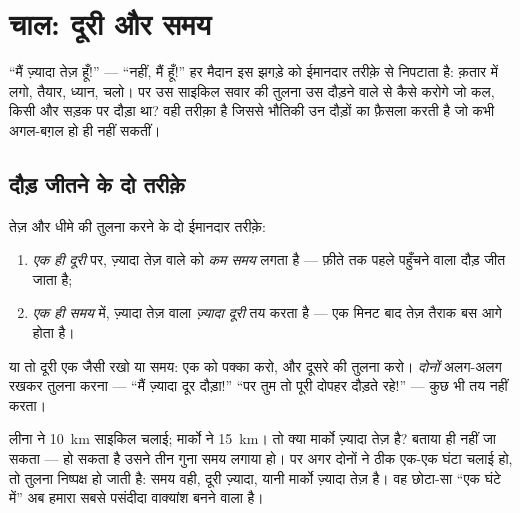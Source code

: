 \chapter{चाल: दूरी और समय}\label{ch:g5:speed-distance-time}

``मैं ज़्यादा तेज़ हूँ!'' --- ``नहीं, मैं हूँ!'' हर मैदान इस झगड़े को
ईमानदार तरीक़े से निपटाता है: क़तार में लगो, तैयार, ध्यान, चलो। पर उस
साइकिल सवार की तुलना उस दौड़ने वाले से कैसे करोगे जो कल, किसी और सड़क
पर दौड़ा था?  वही तरीक़ा है जिससे भौतिकी उन दौड़ों का फ़ैसला करती है
जो कभी अगल-बग़ल हो ही नहीं सकतीं।

\section{दौड़ जीतने के दो तरीक़े}

\begin{proposition}[निष्पक्ष दौड़ के नियम]\label{prop:g5:speed-distance-time:rules}
तेज़ और धीमे की तुलना करने के दो ईमानदार तरीक़े:
\begin{enumerate}
  \item \emph{एक ही दूरी} पर, ज़्यादा तेज़ वाले को \emph{कम समय}
        लगता है --- फ़ीते तक पहले पहुँचने वाला दौड़ जीत जाता है;
  \item \emph{एक ही समय} में, ज़्यादा तेज़ वाला \emph{ज़्यादा दूरी}
        तय करता है --- एक मिनट बाद तेज़ तैराक बस आगे होता है।
\end{enumerate}
या तो दूरी एक जैसी रखो या समय: एक को पक्का करो, और दूसरे की तुलना
करो। \emph{दोनों} अलग-अलग रखकर तुलना करना --- ``मैं ज़्यादा दूर
दौड़ा!'' ``पर तुम तो पूरी दोपहर दौड़ते रहे!'' --- कुछ भी तय नहीं
करता।
\end{proposition}

\begin{example}[नाइंसाफ़ी और इंसाफ़]\label{ex:g5:speed-distance-time:fair}
लीना ने \qty{10}{km} साइकिल चलाई; मार्को ने \qty{15}{km}। तो क्या
मार्को ज़्यादा तेज़ है? बताया ही नहीं जा सकता --- हो सकता है उसने तीन
गुना समय लगाया हो। पर अगर दोनों ने ठीक एक-एक घंटा चलाई हो, तो तुलना
निष्पक्ष हो जाती है: समय वही, दूरी ज़्यादा, यानी मार्को ज़्यादा तेज़
है। वह छोटा-सा ``एक घंटे में'' अब हमारा सबसे पसंदीदा वाक्यांश बनने
वाला है।
\end{example}

